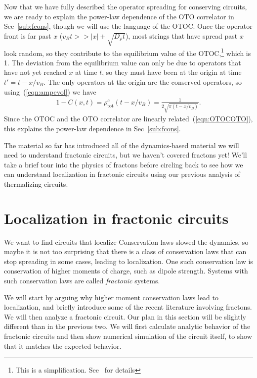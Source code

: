 \documentclass[a4paper,11pt]{article}
\renewcommand{\th}[1]{\frac{1}{#1}}
\newcommand{\abs}[1]{\left| #1 \right|}
\newcommand{\tot}{\text{tot}}
\begin{document}
Now that we have fully described the operator spreading for conserving circuits, we are ready to explain the power-law dependence of the OTO correlator in Sec~\ref{sub:fcons}, though we will use the language of the OTOC.
Once the operator front is far past $x$ ($v_Bt>>\abs{x}+\sqrt{D_\rho t}$), most strings that have spread past $x$ look random, so they contribute to the equilibrium value of the OTOC,\footnote{This is a simplification. See~\cite{KhemaniOpSp} for details} which is 1. The deviation from the equilibrium value can only be due to operators that have not yet reached $x$ at time $t$, so they must have been at the origin at time $t'=t-x/v_B$. The only operators at the origin are the conserved operators, so using~(\ref{eqn:ampevol}) we have
\begin{align}
1-C(x,t) = \rho^c_\tot(t-x/v_B) = \th{2\sqrt{\pi(t-x/v_B)}}.
\end{align}
Since the OTOC and the OTO correlator are linearly related~(\ref{eqn:OTOCOTO}), this explains the power-law dependence in Sec~\ref{sub:fcons}.

The material so far has introduced all of the dynamics-based material we will need to understand fractonic circuits, but we haven't covered fractons yet! We'll take a brief tour into the physics of fractons before circling back to see how we can understand localization in fractonic circuits using our previous analysis of thermalizing circuits.


\section{Localization in fractonic circuits} \label{sec:fraccirc}

We want to find circuits that localize 
Conservation laws slowed the dynamics, so maybe it is not too surprising that there is a class of conservation laws that can stop spreading in some cases, leading to localization. One such conservation law is conservation of higher moments of charge, such as dipole strength. Systems with such conservation laws are called \emph{fractonic} systems.

We will start by arguing why higher moment conservation laws lead to localization, and briefly introduce some of the recent literature involving fractons. We will then analyze a fractonic circuit. Our plan in this section will be slightly different than in the previous two. We will first calculate analytic behavior of the fractonic circuits and then show numerical simulation of the circuit itself, to show that it matches the expected behavior.
\end{document}

